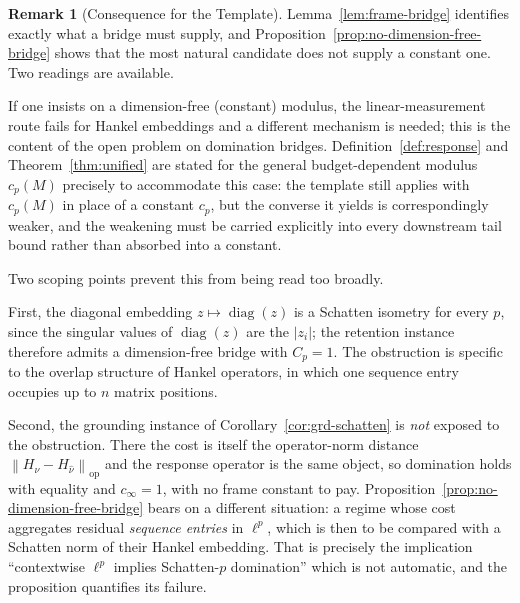 \documentclass[12pt]{article}
\theoremstyle{definition}
\newtheorem{remark}[theorem]{Remark}
\newcommand{\norm}[1]{\left\lVert#1\right\rVert}
\begin{document}
\begin{remark}[Consequence for the Template]
\label{rem:bridge-consequence}
Lemma~\ref{lem:frame-bridge} identifies exactly what a bridge must supply, and
Proposition~\ref{prop:no-dimension-free-bridge} shows that the most natural
candidate does not supply a constant one.  Two readings are available.

If one insists on a dimension-free (constant) modulus, the linear-measurement
route fails for Hankel embeddings and a different mechanism is needed; this
is the content of the open problem on domination bridges.  Definition~\ref{def:response}
and Theorem~\ref{thm:unified} are stated for the general budget-dependent
modulus $c_p(M)$ precisely to accommodate this case: the template still
applies with $c_p(M)$ in place of a constant $c_p$, but the converse it
yields is correspondingly weaker, and the weakening must be carried
explicitly into every downstream tail bound rather than absorbed into a
constant.

Two scoping points prevent this from being read too broadly.

First, the diagonal embedding $z\mapsto\operatorname{diag}(z)$ is a Schatten
isometry for every $p$, since the singular values of $\operatorname{diag}(z)$
are the $|z_i|$; the retention instance therefore admits a dimension-free
bridge with $C_p=1$.  The obstruction is specific to the overlap structure of
Hankel operators, in which one sequence entry occupies up to $n$ matrix
positions.

Second, the grounding instance of Corollary~\ref{cor:grd-schatten} is
\emph{not} exposed to the obstruction.  There the cost is itself the
operator-norm distance $\norm{H_\nu-H_{\widehat\nu}}_{\mathrm{op}}$ and the
response operator is the same object, so domination holds with equality and
$c_\infty=1$, with no frame constant to pay.
Proposition~\ref{prop:no-dimension-free-bridge} bears on a different
situation: a regime whose cost aggregates residual \emph{sequence entries} in
$\ell^p$, which is then to be compared with a Schatten norm of their Hankel
embedding.  That is precisely the implication ``contextwise $\ell^p$ implies
Schatten-$p$ domination'' which is not automatic, and the proposition
quantifies its failure.
\end{remark}
\end{document}
